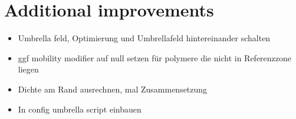 \documentclass[bachelor,       %
               twoside,        %
               BCOR10mm,       %
               ngerman, english %
               ]{GAUBM}
\begin{document}
\section{Additional improvements}

\begin{itemize}
    \item Umbrella feld, Optimierung und Umbrellafeld hintereinander schalten
    \item ggf mobility modifier auf null setzen für polymere die nicht in Referenzzone liegen
    \item Dichte am Rand ausrechnen, mal Zusammensetzung
    \item In config umbrella script einbauen
\end{itemize}





\end{document}

